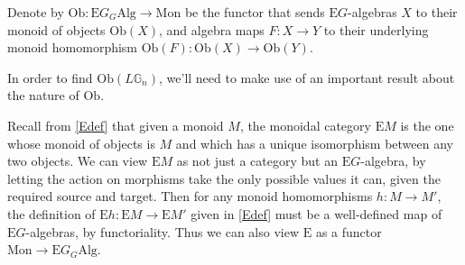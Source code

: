 \begin{defn}\label{Obdef} Denote by $\mathrm{Ob}: \mathrm{E}G_G\mathrm{Alg} \to \mathrm{Mon}$ be the functor that sends $\mathrm{E}G$-algebras $X$ to their monoid of objects $\mathrm{Ob}(X)$, and algebra maps $F: X \to Y$ to their underlying monoid homomorphism $\mathrm{Ob}(F): \mathrm{Ob}(X) \to \mathrm{Ob}(Y)$. \end{defn}

In order to find $\mathrm{Ob}(L\mathbb{G}_n)$, we'll need to make use of an important result about the nature of $\mathrm{Ob}$.

\begin{defn}\label{Edef2} Recall from \cref{Edef} that given a monoid $M$, the monoidal category $\mathrm{E}M$ is the one whose monoid of objects is $M$ and which has a unique isomorphism between any two objects. We can view $\mathrm{E}M$ as not just a category but an $\mathrm{E}G$-algebra, by letting the action on morphisms take the only possible values it can, given the required source and target. Then for any monoid homomorphisms $h: M \to M'$, the definition of $\mathrm{E}h: \mathrm{E}M \to \mathrm{E}M'$ given in \cref{Edef} must be a well-defined map of $\mathrm{E}G$-algebras, by functoriality. Thus we can also view $\mathrm{E}$ as a functor $\mathrm{Mon} \to \mathrm{E}G_G\mathrm{Alg}$.
 \end{defn}

